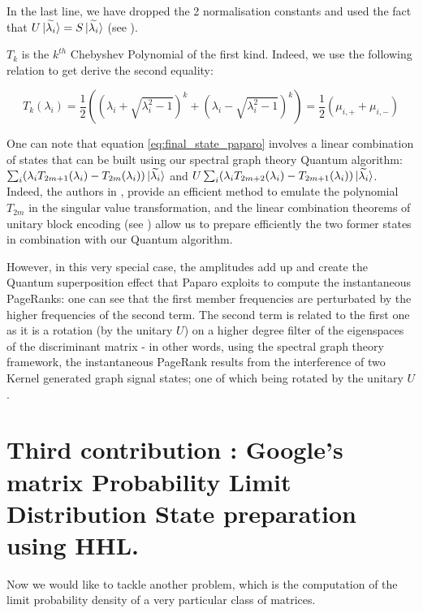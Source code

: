 \documentclass[sn-mathphys]{sn-jnl}%
\theoremstyle{thmstyleone}%
\theoremstyle{thmstyletwo}%
\theoremstyle{thmstylethree}%
\begin{document}
In the last line, we have dropped the 2 normalisation constants and used the fact that $U\ket{\widetilde{\lambda_i}} = S\ket{\widetilde{\lambda_i}}$ (see \cite{paparo_martin-delgado_2012}). 

$T_k$ is the $k^{th}$ Chebyshev Polynomial of the first kind. Indeed, we use the following relation to get derive the second equality:

\begin{equation}
    T_k(\lambda_i) = \frac{1}{2}( (\lambda_i + \sqrt{\lambda_i^2 -1})^k + (\lambda_i - \sqrt{\lambda_i^2 -1})^k) = \frac{1}{2} (\mu_{i, +} + \mu_{i, -})
\end{equation}

One can note that equation \ref{eq:final_state_paparo} involves a linear combination of states that can be built using our spectral graph theory Quantum algorithm: $\sum_i (\lambda_i T_{2m+1}(\lambda_i) - T_{2m}(\lambda_i) ) \ket{\widetilde{\lambda_i}}$ and $ U \sum_i (\lambda_i T_{2m+2}(\lambda_i) - T_{2m+1} (\lambda_i) ) \ket{\widetilde{\lambda_i}}$. Indeed, the authors in \cite{gilyen_su_low_wiebe_2019}, provide an efficient method to emulate the polynomial $T_{2m}$ in the singular value transformation, and the linear combination theorems of unitary block encoding (see \cite{gilyen_su_low_wiebe_2019}) allow us to prepare efficiently the two former states in combination with our Quantum algorithm.

However, in this very special case, the amplitudes add up and create the Quantum superposition effect that Paparo exploits to compute the instantaneous PageRanks: one can see that the first member frequencies are perturbated by the higher frequencies of the second term. The second term is related to the first one as it is a rotation (by the unitary $U$) on a higher degree filter of the eigenspaces of the discriminant matrix - in other words, using the spectral graph theory framework, the instantaneous PageRank results from the interference of two Kernel generated graph signal states; one of which being rotated by the unitary $U$.

\section{Third contribution : Google's matrix Probability Limit Distribution State preparation using HHL.}

Now we would like to tackle another problem, which is the computation
of the limit probability density of a very particular class of
matrices.
\end{document}
